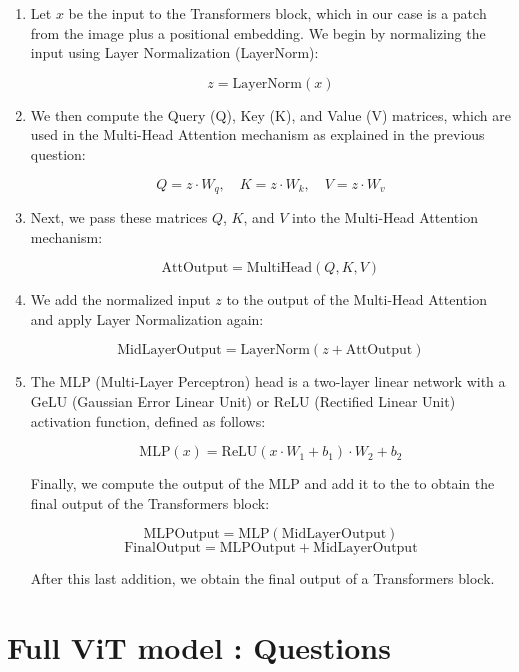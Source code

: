 \begin{enumerate}
    \item Let \( x \) be the input to the Transformers block, which in our case is a patch from the image plus a positional embedding. We begin by normalizing the input using Layer Normalization (LayerNorm):

        \[
            z = \text{LayerNorm}(x)
        \]

    \item We then compute the Query (Q), Key (K), and Value (V) matrices, which are used in the Multi-Head Attention mechanism as explained in the previous question:

        \[
            Q = z \cdot W_q, \quad K = z \cdot W_k, \quad V = z \cdot W_v
        \]

    \item Next, we pass these matrices \( Q \), \( K \), and \( V \) into the Multi-Head Attention mechanism:

        \[
            \text{AttOutput} = \text{MultiHead}(Q, K, V)
        \]

    \item We add the normalized input \( z \) to the output of the Multi-Head Attention and apply Layer Normalization again:

        \[
            \text{MidLayerOutput} = \text{LayerNorm}(z + \text{AttOutput})
        \]

    \item The MLP (Multi-Layer Perceptron) head is a two-layer linear network with a GeLU (Gaussian Error Linear Unit) or ReLU (Rectified Linear Unit) activation function, defined as follows:

        \[
            \text{MLP}(x) = \text{ReLU}(x \cdot W_1 + b_1) \cdot W_2 + b_2
        \]

    Finally, we compute the output of the MLP and add it to the  to obtain the final output of the Transformers block:

        \[
            \text{MLPOutput} = \text{MLP}(\text{MidLayerOutput})
        \]
        \[
            \text{FinalOutput} = \text{MLPOutput} + \text{MidLayerOutput}
        \]

    After this last addition, we obtain the final output of a Transformers block.
\end{enumerate}

\section{Full ViT model : Questions}

